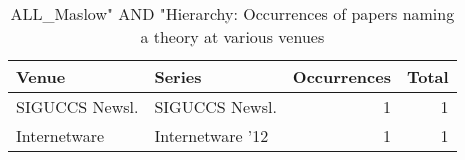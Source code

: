 \begin{table*}[t]
\begin{tabular}{llrr}
Venue & Series & Occurrences & Total\\\hline
\multirow{1}{*}{SIGUCCS Newsl.} & SIGUCCS Newsl. & 1 & \multirow{1}{*}{1}\\
\multirow{1}{*}{Internetware } & Internetware '12 & 1 & \multirow{1}{*}{1}\\
\end{tabular}
\caption{ALL\_Maslow" AND "Hierarchy: Occurrences of papers naming a theory at various venues}
\end{table*}